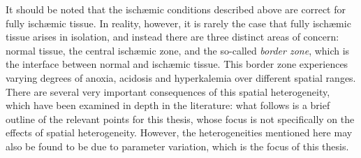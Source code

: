 \documentclass[../thesis-main.tex]{subfiles}
\begin{document}
 It should be noted that the isch\ae mic conditions described above are correct for fully isch\ae mic tissue. In reality, however, it is rarely the case that fully isch\ae mic tissue arises in isolation, and instead there are three distinct areas of concern: normal tissue, the central isch\ae mic zone, and the so-called \emph{border zone}, which is the interface between normal and isch\ae mic tissue. This border zone experiences varying degrees of anoxia, acidosis and hyperkalemia over different spatial ranges. There are several very important consequences of this spatial heterogeneity, which have been examined in depth in the literature: what follows is a brief outline of the relevant points for this thesis, whose focus is not specifically on the effects of spatial heterogeneity. However, the heterogeneities mentioned here may also be found to be due to parameter variation, which is the focus of this thesis.
 
\end{document}

